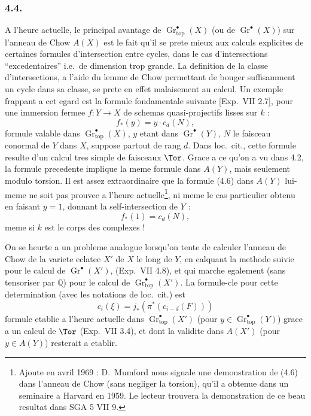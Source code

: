 \subsubsection*{4.4.}
A l'heure actuelle, le principal avantage de $\operatorname{Gr}_{\mathrm{top}}^{\bullet}(X)$ (ou de $\operatorname{Gr}^{\bullet}(X)$) sur l'anneau de Chow $A(X)$ est le fait qu'il se prete mieux aux calculs explicites de certaines formules d'intersection entre cycles, dans le cas d'intersections ``excedentaires'' i.e.\ de dimension trop grande. La definition de la classe d'intersections, a l'aide du lemme de Chow permettant de bouger suffisamment un cycle dans sa classe, se prete en effet malaisement au calcul. Un exemple frappant a cet egard est la formule fondamentale suivante [Exp.\ VII 2.7], pour une immersion fermee $f : Y \to X$ de schemas quasi-projectifs lisses sur $k$ :
\[
f_{*}(y) = y \cdot c_d(N), \tag{4.6}
\]
formule valable dans $\operatorname{Gr}_{\mathrm{top}}^{\bullet}(X)$, $y$ etant dans $\operatorname{Gr}^{\bullet}(Y)$, $N$ le faisceau conormal de $Y$ dans $X$, suppose partout de rang $d$. Dans loc.\ cit., cette formule resulte d'un calcul tres simple de faisceaux $\Tor$. Grace a ce qu'on a vu dans 4.2, la formule precedente implique la meme formule dans $A(Y)$, mais seulement modulo torsion. Il est assez extraordinaire que la formule (4.6) dans $A(Y)$ lui-meme ne soit pas prouvee a l'heure actuelle\footnote{Ajoute en avril 1969 : D.\ Mumford nous signale une demonstration de (4.6) dans l'anneau de Chow (sans negliger la torsion), qu'il a obtenue dans un seminaire a Harvard en 1959. Le lecteur trouvera la demonstration de ce beau resultat dans SGA 5 VII 9.}, ni meme le cas particulier obtenu en faisant $y = 1$, donnant la self-intersection de $Y$ :
\[
f_{*}(1) = c_d(N), \tag{4.7}
\]
meme si $k$ est le corps des complexes !

On se heurte a un probleme analogue lorsqu'on tente de calculer l'anneau de Chow de la variete eclatee $X'$ de $X$ le long de $Y$, en calquant la methode suivie pour le calcul de $\operatorname{Gr}^{\bullet}(X')$, (Exp.\ VII 4.8), et qui marche egalement (sans tensoriser par $\mathbb{Q}$) pour le calcul de $\operatorname{Gr}_{\mathrm{top}}^{\bullet}(X')$. La formule-cle pour cette determination (avec les notations de loc.\ cit.) est
\[
c_i(\xi) = j_{*}(\pi^{*}(c_{i-d}(F))) \tag{4.8}
\]
formule etablie a l'heure actuelle dans $\operatorname{Gr}_{\mathrm{top}}^{\bullet}(X')$ (pour $y \in \operatorname{Gr}_{\mathrm{top}}^{\bullet}(Y)$) grace a un calcul de $\Tor$ (Exp.\ VII 3.4), et dont la validite dans $A(X')$ (pour $y \in A(Y)$) resterait a etablir.

